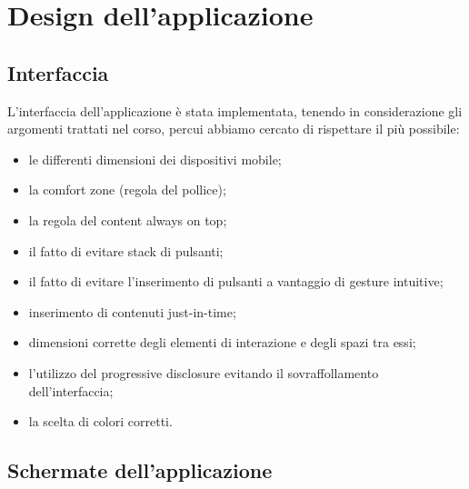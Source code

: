 \chapter{Design dell'applicazione\label{sec:design}}

\section{Interfaccia\label{sec:interfaccia}}
L'interfaccia dell'applicazione è stata implementata, tenendo in considerazione gli argomenti trattati nel corso, percui abbiamo cercato di rispettare il più possibile:
\begin{itemize}
\item le differenti dimensioni dei dispositivi mobile;
\item la comfort zone (regola del pollice);
\item la regola del content always on top;
\item il fatto di evitare stack di pulsanti;
\item il fatto di evitare l'inserimento di pulsanti a vantaggio di gesture intuitive;
\item inserimento di contenuti just-in-time;
\item dimensioni corrette degli elementi di interazione e degli spazi tra essi;
\item l'utilizzo del progressive disclosure evitando il sovraffollamento dell'interfaccia;
\item la scelta di colori corretti.
\end{itemize}
\section{Schermate dell'applicazione\label{sec:schermate}}
